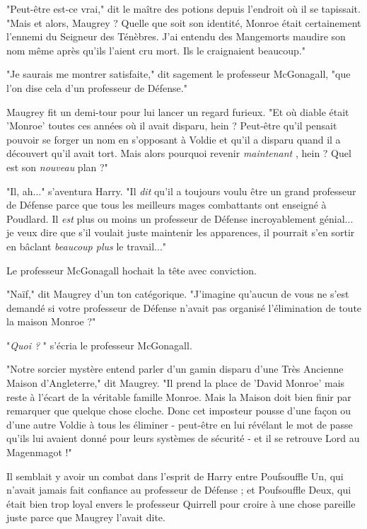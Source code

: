 "Peut-être est-ce vrai," dit le maître des potions depuis l'endroit où il se tapissait. "Mais et alors, Maugrey ? Quelle que soit son identité, Monroe était certainement l'ennemi du Seigneur des Ténèbres. J'ai entendu des Mangemorts maudire son nom même après qu'ils l'aient cru mort. Ils le craignaient beaucoup."

"Je saurais me montrer satisfaite," dit sagement le professeur McGonagall, "que l'on dise cela d'un professeur de Défense."

Maugrey fit un demi-tour pour lui lancer un regard furieux. "Et où diable était 'Monroe' toutes ces années où il avait disparu, hein ? Peut-être qu'il pensait pouvoir se forger un nom en s'opposant à Voldie et qu'il a disparu quand il a découvert qu'il avait tort. Mais alors pourquoi revenir \emph{maintenant} , hein ? Quel est son \emph{nouveau } plan ?"

"Il, ah..." s'aventura Harry. "Il \emph{dit}  qu'il a toujours voulu être un grand professeur de Défense parce que tous les meilleurs mages combattants ont enseigné à Poudlard. Il \emph{est } plus ou moins un professeur de Défense incroyablement génial... je veux dire que s'il voulait juste maintenir les apparences, il pourrait s'en sortir en bâclant \emph{beaucoup plus } le travail..."

Le professeur McGonagall hochait la tête avec conviction.

"Naïf," dit Maugrey d'un ton catégorique. "J'imagine qu'aucun de vous ne s'est demandé si votre professeur de Défense n'avait pas organisé l'élimination de toute la maison Monroe ?"

"\emph{Quoi ?} " s'écria le professeur McGonagall.

"Notre sorcier mystère entend parler d'un gamin disparu d'une Très Ancienne Maison d'Angleterre," dit Maugrey. "Il prend la place de 'David Monroe' mais reste à l'écart de la véritable famille Monroe. Mais la Maison doit bien finir par remarquer que quelque chose cloche. Donc cet imposteur pousse d'une façon ou d'une autre Voldie à tous les éliminer - peut-être en lui révélant le mot de passe qu'ils lui avaient donné pour leurs systèmes de sécurité - et il se retrouve Lord au Magenmagot !"

Il semblait y avoir un combat dans l'esprit de Harry entre Poufsouffle Un, qui n'avait jamais fait confiance au professeur de Défense ; et Poufsouffle Deux, qui était bien trop loyal envers le professeur Quirrell pour croire à une chose pareille juste parce que Maugrey l'avait dite.

